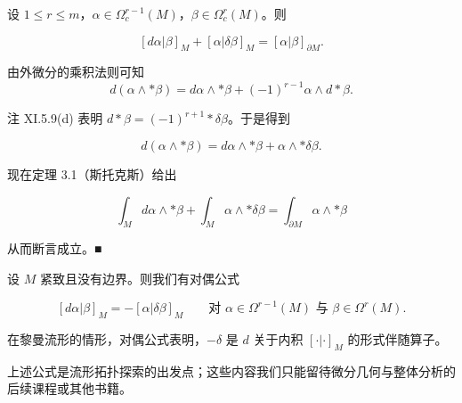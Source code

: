 \begin{proposition}

设 $ 1 \le r \le m $，$ \alpha \in \Omega_c^{r-1}(M) $，$ \beta \in \Omega_c^r(M) $。则

\[
[d\alpha|\beta]_M + [\alpha|\delta\beta]_M = [\alpha|\beta]_{\partial M} .
\]

\proofhead
由外微分的乘积法则可知
\[
d(\alpha \wedge \ast\beta) = d\alpha \wedge \ast\beta + (-1)^{r-1}\alpha \wedge d\ast\beta .
\]

注 XI.5.9(d) 表明 $ d\ast\beta = (-1)^{r+1}\ast\delta\beta $。于是得到

\[
d(\alpha \wedge \ast\beta) = d\alpha \wedge \ast\beta + \alpha \wedge \ast\delta\beta .
\]

现在定理 3.1（斯托克斯）给出

\[
\int_M d\alpha\wedge\ast\beta + \int_M \alpha\wedge\ast\delta\beta = \int_{\partial M} \alpha\wedge\ast\beta
\]

从而断言成立。\nobreak\hspace{0.35em}■

\end{proposition}

\begin{corollary}

设 $ M $ 紧致且没有边界。则我们有对偶公式

\[
[d\alpha|\beta]_M = -[\alpha|\delta\beta]_M \qquad \text{对 } \alpha \in \Omega^{r-1}(M) \text{ 与 } \beta \in \Omega^r(M).
\]

在黎曼流形的情形，对偶公式表明，$ -\delta $ 是 $ d $ 关于内积 $ [\cdot|\cdot]_M $ 的形式伴随算子。

上述公式是流形拓扑探索的出发点；这些内容我们只能留待微分几何与整体分析的后续课程或其他书籍。

\end{corollary}

\exerciseshead

